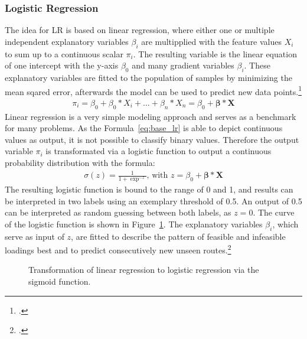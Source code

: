 \subsubsection{Logistic Regression}

The idea for \gls{LR} is based on linear regression, where either one or multiple independent explanatory
variables $\beta_i$ are multipplied with the feature values $X_i$ to sum up to a continuous scalar $\pi_i$.
The resulting variable is the linear equation of one intercept with the y-axis $\beta_0$
and many gradient variables $\beta_i$.
These explanatory variables are fitted to the population of samples by minimizing the mean sqared
error, afterwards the model can be used to predict new data points.\footcite[cf.][pp. 6-7]{nasteski_overview_2017}
\begin{align}
    \pi_i=\beta_0+\beta_0*X_i+\dots+\beta_n*X_n = \beta_0 + \bm{\beta} * \bm{X}
    \label{eq:base_lr}
\end{align}
Linear regression is a very simple modeling approach and serves as a benchmark for many problems. As the Formula~\ref{eq:base_lr} is able to depict continuous
values as output, it is not possible to classify binary values. Therefore the output variable $\pi_i$ is transformated via a logistic function
to output a continuous probability distribution with the formula:
\begin{align}
    \sigma(z)=\frac{1}{1+\exp^{-z}},\, \text{with } z = \beta_0 + \bm{\beta} * \bm{X}
    \label{eq:logistic_func}
\end{align}
The resulting logistic function is bound to the range of 0 and 1, and results can be interpreted
in two labels using an exemplary threshold of 0.5. An output of 0.5 can be interpreted as random
guessing between both labels, as $z=0$. The curve of the logistic function is shown in Figure~\ref{fig:LR_plot}.
The explanatory variables $\beta_i$, which serve as input
of $z$, are fitted to describe the pattern of feasible and infeasible loadings best and to predict
consecutively new unseen routes.\footcite[cf.][]{kirasich_random_2018}
\begin{figure}[ht]
    \centering
    \caption{Transformation of linear regression to logistic regression via the sigmoid function.}
    \label{fig:LR_plot}
\end{figure}



